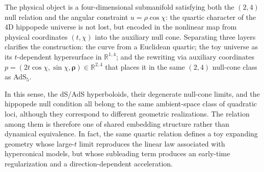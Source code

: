 \documentclass[preprint,12pt]{elsarticle}
\renewcommand{\vec}[1]{\boldsymbol{#1}}
\begin{document}

The physical object is a four-dimensional submanifold satisfying both the $(2,4)$ null relation and the angular constraint $u=\rho\cos\chi$: the quartic character of the 4D hippopede universe is not lost, but encoded in the nonlinear map from physical coordinates $(t,\chi)$ into the auxiliary null cone. Separating three layers clarifies the construction: the curve from a Euclidean quartic; the toy universe as its $t$-dependent hypersurface in $\mathbb{R}^{1,4}$; and the rewriting via auxiliary coordinates $p=(2t\cos\chi,\sin\chi,\vec{\rho})\in\mathbb{R}^{2,4}$ that places it in the same $(2,4)$ null-cone class as AdS${}_5$.

In this sense, the dS/AdS hyperboloids, their degenerate null-cone limits, and the hippopede null condition all belong to the same ambient-space class of quadratic loci, although they correspond to different geometric realizations. The relation among them is therefore one of shared embedding structure rather than dynamical equivalence. In fact, the same quartic relation defines a toy expanding geometry whose large-$t$ limit reproduces the linear law associated with hyperconical models, but whose subleading term produces an early-time regularization and a direction-dependent acceleration.
\end{document}
